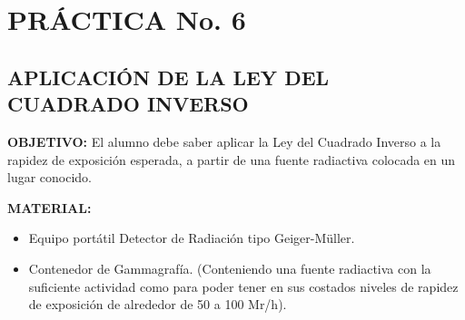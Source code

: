 \section*{PRÁCTICA No. 6}

\subsection*{APLICACIÓN DE LA LEY DEL CUADRADO INVERSO}

\textbf{OBJETIVO:} El alumno debe saber aplicar la Ley del Cuadrado Inverso a la rapidez de exposición esperada, a partir de una fuente radiactiva colocada en un lugar conocido.

\textbf{MATERIAL:}
\begin{itemize}
    \item Equipo portátil Detector de Radiación tipo Geiger-Müller.
    \item Contenedor de Gammagrafía. (Conteniendo una fuente radiactiva con la suficiente actividad como para poder tener en sus costados niveles de rapidez de exposición de alrededor de 50 a 100 Mr/h).
\end{itemize}

